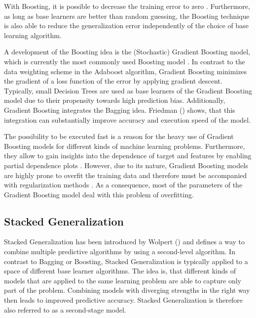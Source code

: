 \documentclass[12pt]{article}
\begin{document}
With Boosting, it is possible to decrease the training error to zero \citep[p.11ff.]{freund1996experiments}. Furthermore, as long as base learners are better than random guessing, the Boosting technique is also able to reduce the generalization error independently of the choice of base learning algorithm.

A development of the Boosting idea is the (Stochastic) Gradient Boosting model, which is currently the most commonly used Boosting model \citep{friedman2001greedy, friedman2002stochastic}. In contrast to the data weighting scheme in the Adaboost algorithm, Gradient Boosting minimizes the gradient of a loss function of the error by applying gradient descent. Typically, small Decision Trees are used as base learners of the Gradient Boosting model due to their propensity towards high prediction bias. Additionally, Gradient Boosting integrates the Bagging idea. Friedman (\citeyear{friedman2002stochastic}) shows, that this integration can substantially improve accuracy and execution speed of the model.

The possibility to be executed fast is a reason for the heavy use of Gradient Boosting models for different kinds of machine learning problems. Furthermore, they allow to gain insights into the dependence of target and features by enabling partial dependence plots \citep[p.1219ff.]{friedman2001greedy}. However, due to its nature, Gradient Boosting models are highly prone to overfit the training data and therefore must be accompanied with regularization methods \citep[p.1203]{friedman2002stochastic}. As a consequence, most of the parameters of the Gradient Boosting model deal with this problem of overfitting.


\subsection{Stacked Generalization}\label{stacking}
Stacked Generalization has been introduced by Wolpert (\citeyear{wolpert1992stacked}) and defines a way to combine multiple predictive algorithms by using a second-level algorithm. In contrast to Bagging or Boosting, Stacked Generalization is typically applied to a space of different base learner algorithms. The idea is, that different kinds of models that are applied to the same learning problem are able to capture only part of the problem. Combining models with diverging strengths in the right way then leads to improved predictive accuracy. Stacked Generalization is therefore also referred to as a second-stage model.
\end{document}
